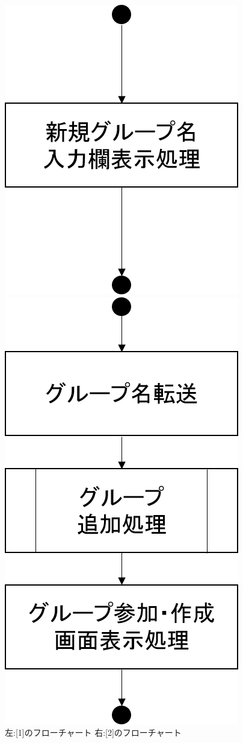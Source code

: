 \begin{figure}[htbp]
 \begin{minipage}{0.5\hsize}
  \begin{center}
   \includegraphics[width=0.5\linewidth,clip]{./img/create_group/sub1.png}
  \end{center}
 \end{minipage}
 \begin{minipage}{0.5\hsize}
  \begin{center}
   \includegraphics[width=0.5\linewidth,clip]{./img/create_group/sub2.png}
  \end{center}
 \end{minipage}
 \caption{左:[1]のフローチャート 右:[2]のフローチャート}\label{fig:creategroupflow0}
\end{figure}


